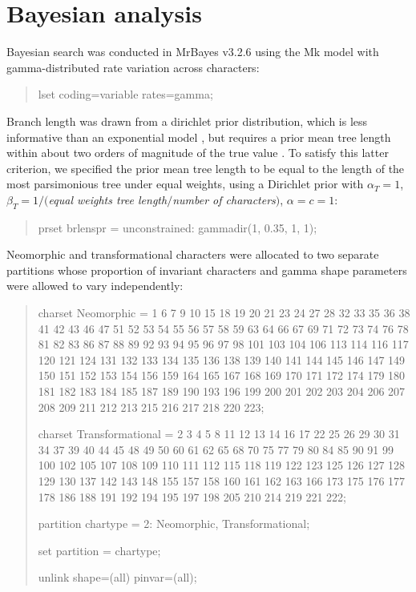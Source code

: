 \documentclass[openany]{book}
\theoremstyle{definition}
\theoremstyle{definition}
\theoremstyle{definition}
\theoremstyle{remark}
\begin{document}
\hypertarget{bayesian}{\chapter{Bayesian analysis}\label{bayesian}}

Bayesian search was conducted in MrBayes v3.2.6 \citep{Ronquist2012}
using the Mk model \citep{Lewis2001} with gamma-distributed rate
variation across characters:

\begin{quote}
lset coding=variable rates=gamma;
\end{quote}

Branch length was drawn from a dirichlet prior distribution, which is
less informative than an exponential model \citep{Rannala2012}, but
requires a prior mean tree length within about two orders of magnitude
of the true value \citep{Zhang2012}. To satisfy this latter criterion,
we specified the prior mean tree length to be equal to the length of the
most parsimonious tree under equal weights, using a Dirichlet prior with
\(\alpha_T = 1\), \(\beta_T = 1/(\)\emph{equal weights tree
length}\(/\)\emph{number of characters}\()\), \(\alpha = c = 1\):

\begin{quote}
prset brlenspr = unconstrained: gammadir(1, 0.35, 1, 1);
\end{quote}

Neomorphic and transformational characters
\citep[\emph{sensu}][]{Sereno2007} were allocated to two separate
partitions whose proportion of invariant characters and gamma shape
parameters were allowed to vary independently:

\begin{quote}
charset Neomorphic = 1 6 7 9 10 15 18 19 20 21 23 24 27 28 32 33 35 36
38 41 42 43 46 47 51 52 53 54 55 56 57 58 59 63 64 66 67 69 71 72 73 74
76 78 81 82 83 86 87 88 89 92 93 94 95 96 97 98 101 103 104 106 113 114
116 117 120 121 124 131 132 133 134 135 136 138 139 140 141 144 145 146
147 149 150 151 152 153 154 156 159 164 165 167 168 169 170 171 172 174
179 180 181 182 183 184 185 187 189 190 193 196 199 200 201 202 203 204
206 207 208 209 211 212 213 215 216 217 218 220 223;

charset Transformational = 2 3 4 5 8 11 12 13 14 16 17 22 25 26 29 30 31
34 37 39 40 44 45 48 49 50 60 61 62 65 68 70 75 77 79 80 84 85 90 91 99
100 102 105 107 108 109 110 111 112 115 118 119 122 123 125 126 127 128
129 130 137 142 143 148 155 157 158 160 161 162 163 166 173 175 176 177
178 186 188 191 192 194 195 197 198 205 210 214 219 221 222;

partition chartype = 2: Neomorphic, Transformational;

set partition = chartype;

unlink shape=(all) pinvar=(all);
\end{quote}
\end{document}
